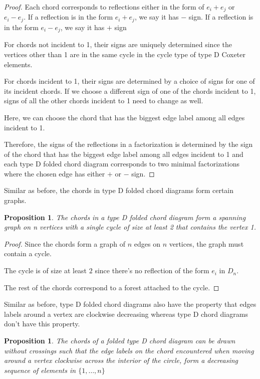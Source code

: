 \documentclass[11pt]{amsart}
\newtheorem{prop}[thm]{Proposition}%
\begin{document}
\begin{proof}
    Each chord corresponds to reflections either in the form of $e_i+e_j$ or $e_i-e_j$. If a reflection is in the form $e_i+e_j$, we say it has $-$ sign. If a reflection is in the form $e_i-e_j$, we say it has $+$ sign

    For chords not incident to 1, their signs are uniquely determined since the vertices other than 1 are in the same cycle in the cycle type of type D Coxeter elements.

    For chords incident to 1, their signs are determined by a choice of signs for one of its incident chords. If we choose a different sign of one of the chords incident to 1, signs of all the other chords incident to 1 need to change as well.

    Here, we can choose the chord that has the biggest edge label among all edges incident to 1.

    Therefore, the signs of the reflections in a factorization is determined by the sign of the chord that has the biggest edge label among all edges incident to 1 and each type D folded chord diagram corresponds to two minimal factorizations where the chosen edge has either $+$ or $-$ sign.
\end{proof}

Similar as before, the chords in type D folded chord diagrams form certain graphs.

\begin{prop}
    The chords in a type D folded chord diagram form a spanning graph on n vertices with a single cycle of size at least 2 that contains the vertex 1.
\end{prop}

\begin{proof}
    Since the chords form a graph of $n$ edges on $n$ vertices, the graph must contain a cycle.

    The cycle is of size at least $2$ since there's no reflection of the form $e_i$ in $D_n$.

    The rest of the chords correspond to a forest attached to the cycle.
\end{proof}

Similar as before, type D folded chord diagrams also have the property that edges labels around a vertex are clockwise decreasing whereas type D chord diagrams don't have this property.

\begin{prop}
    The chords of a folded type D chord diagram can be drawn without crossings such that the edge labels on the chord encountered when moving around a vertex clockwise across the interior of the circle, form a decreasing sequence of elements in $\{1,\dots,n\}$
\end{prop}
\end{document}
